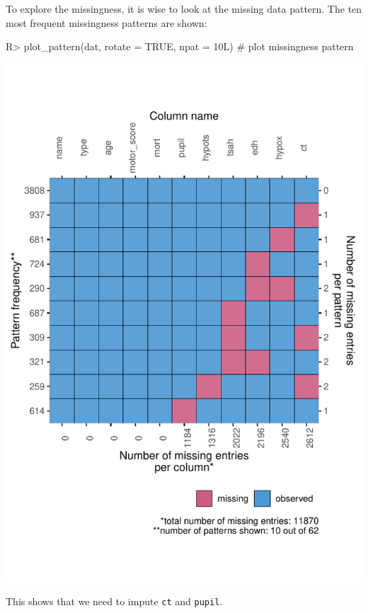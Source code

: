 \documentclass[
]{jss}
\begin{document}
To explore the missingness, it is wise to look at the missing data
pattern. The ten most frequent missingness patterns are shown:

\begin{CodeChunk}
\begin{CodeInput}
R> plot_pattern(dat, rotate = TRUE, npat = 10L)  # plot missingness pattern
\end{CodeInput}


\begin{center}\includegraphics{Imputation_of_Incomplete_Multilevel_Data_files/figure-latex/pattern-1} \end{center}

\end{CodeChunk}

This shows that we need to impute \texttt{ct} and \texttt{pupil}.
\end{document}
